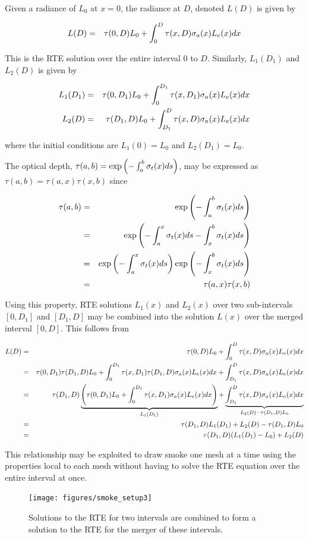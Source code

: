 Given a radiance of $L_0$ at $x=0$, the radiance at $D$, denoted $L(D)$ is given by

\begin{eqnarray}
\label{eq:rtesoln2}
L(D)&=&\tau(0,D)L_0 + \int_0^D\tau(x,D)\sigma_a(x)L_e(x) dx
\end{eqnarray}

This is the RTE solution over the entire interval $0$ to $D$. Similarly, $L_1(D_1)$ and $L_2(D)$ is given by

\begin{eqnarray*}
L_1(D_1)&=&\tau(0,D_1)L_0 + \int_0^{D_1}\tau(x,D_1)\sigma_a(x)L_e(x) dx\\
L_2(D)&=&\tau(D_1,D)L_0 + \int_{D_1}^{D}\tau(x,D)\sigma_a(x)L_e(x) dx
\end{eqnarray*}

where the initial conditions are $L_1(0)=L_0$ and $L_2(D_1)=L_0$.

The optical depth, $\tau(a,b)=\exp\left(-\int_a^b \sigma_t(x) ds\right)$, may be expressed as  $\tau(a,b)=\tau(a,x)\tau(x,b)$ since

\begin{eqnarray*}
\tau(a,b)&=&\exp\left(-\int_a^b \sigma_t(x) ds\right)\\
&=&\exp\left(-\int_a^x \sigma_t(x) ds -\int_x^b \sigma_t(x) ds\right)\\
&=&\exp\left(-\int_a^x \sigma_t(x) ds\right)\exp\left(-\int_x^b \sigma_t(x) ds\right)\\
&=&\tau(a,x)\tau(x,b)
\end{eqnarray*}

Using this property, RTE solutions $L_1(x)$ and $L_2(x)$ over two sub-intervals $[0,D_1]$ and $[D_1,D]$ may be combined into the solution $L(x)$ over the merged interval $[0,D]$.  This follows from

\begin{eqnarray*}
L(D)&=&\tau(0,D)L_0 + \int_0^D\tau(x,D)\sigma_a(x)L_e(x) dx\\
&=&\tau(0,D_1)\tau(D_1,D)L_0 + \int_0^{D_1}\tau(x,D_1)\tau(D_1,D)\sigma_a(x)L_e(x) dx + \int_{D_1}^{D}\tau(x,D)\sigma_a(x)L_e(x) dx\\
&=&\tau(D_1,D)
\underbrace{\left(\tau(0,D_1)L_0 + \int_0^{D_1}\tau(x,D_1)\sigma_a(x)L_e(x) dx\right)}_{L_1(D_1)} +
\underbrace{\int_{D_1}^{D}\tau(x,D)\sigma_a(x)L_e(x) dx}_{L_2(D)-\tau(D_1,D)L_0}\\
&=&\tau(D_1,D)L_1(D_1)+L_2(D)-\tau(D_1,D)L_0\\
&=&\tau(D_1,D)(L_1(D_1)-L_0) + L_2(D)
\end{eqnarray*}

This relationship may be exploited to draw smoke one mesh at a time using the properties local to each mesh without having to solve the RTE equation over the entire interval at once.

\begin{figure}[\figoptions]
\begin{center}
\texttt{[image: figures/smoke\_setup3]}
\end{center}
\caption {Solutions to the RTE for two intervals are combined to form a solution to the RTE
for the merger of these intervals.
}
\label{figsmokesetup3}
\end{figure}
